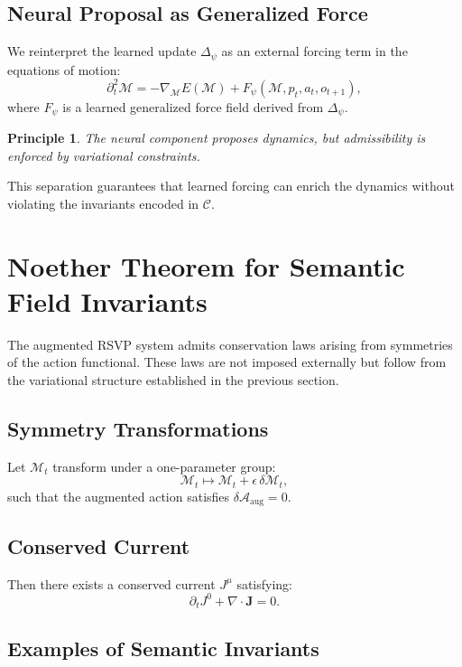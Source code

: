 \documentclass[11pt]{article}
\newtheorem{principle}{Principle}
\begin{document}
\subsection{Neural Proposal as Generalized Force}

We reinterpret the learned update $\Delta_\psi$ as an external forcing term
in the equations of motion:
\[
\partial_t^2 \mathcal{M}
=
-\nabla_{\mathcal{M}} E(\mathcal{M})
+
F_\psi(\mathcal{M},p_t,a_t,o_{t+1}),
\]
where $F_\psi$ is a learned generalized force field derived from $\Delta_\psi$.

\begin{principle}
The neural component proposes dynamics, but admissibility is enforced
by variational constraints.
\end{principle}

This separation guarantees that learned forcing can enrich the dynamics
without violating the invariants encoded in $\mathcal{C}$.

\section{Noether Theorem for Semantic Field Invariants}

The augmented RSVP system admits conservation laws arising from symmetries
of the action functional.
These laws are not imposed externally but follow from the variational
structure established in the previous section.

\subsection{Symmetry Transformations}

Let $\mathcal{M}_t$ transform under a one-parameter group:
\[
\mathcal{M}_t \mapsto \mathcal{M}_t + \epsilon \, \delta \mathcal{M}_t,
\]
such that the augmented action satisfies $\delta \mathcal{A}_{\text{aug}} = 0$.

\subsection{Conserved Current}

Then there exists a conserved current $J^\mu$ satisfying:
\[
\partial_t J^0 + \nabla \cdot \mathbf{J} = 0.
\]

\subsection{Examples of Semantic Invariants}
\end{document}
